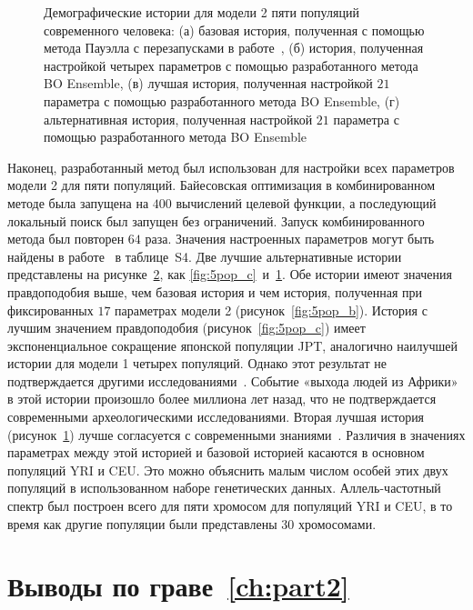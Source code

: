 \begin{figure}
\begin{subfigure}[t]{0.48\textwidth}
        \caption{}
        \label{fig:5pop_d}
    \end{subfigure}
    \caption{Демографические истории для модели 2 пяти популяций современного человека: (а) базовая история, полученная с помощью метода Пауэлла с перезапусками в работе~\cite{jouganous2017inferring}, (б) история, полученная настройкой четырех параметров с помощью разработанного метода BO Ensemble, (в) лучшая история, полученная настройкой $21$ параметра с помощью разработанного метода BO Ensemble, (г) альтернативная история, полученная настройкой $21$ параметра с помощью разработанного метода BO Ensemble}
    \label{fig:5pops_histories}
\end{figure}

Наконец, разработанный метод был использован для настройки всех параметров модели 2 для пяти популяций.
Байесовская оптимизация в комбинированном методе была запущена на $400$ вычислений целевой функции, а последующий локальный поиск был запущен без ограничений.
Запуск комбинированного метода был повторен $64$ раза.
Значения настроенных параметров могут быть найдены в работе~\cite{noskova2023bayesian} в таблице~S4.
Две лучшие альтернативные истории представлены на рисунке~\ref{fig:5pops_histories}, как \ref{fig:5pop_c}~и~\ref{fig:5pop_d}.
Обе истории имеют значения правдоподобия выше, чем базовая история и чем история, полученная при фиксированных $17$ параметрах модели 2 (рисунок~\ref{fig:5pop_b}).
История с лучшим значением правдоподобия (рисунок~\ref{fig:5pop_c}) имеет экспоненциальное сокращение японской популяции JPT, аналогично наилучшей истории для модели 1 четырех популяций.
Однако этот результат не подтверждается другими исследованиями~\cite{nielsen2017tracing}.
Событие «выхода людей из Африки» в этой истории произошло более миллиона лет назад, что не подтверждается современными археологическими исследованиями.
Вторая лучшая история (рисунок~\ref{fig:5pop_d}) лучше согласуется с современными знаниями~\cite{nielsen2017tracing}.
Различия в значениях параметрах между этой историей и базовой историей касаются в основном популяций YRI и CEU.
Это можно объяснить малым числом особей этих двух популяций в использованном наборе генетических данных.
Аллель-частотный спектр был построен всего для пяти хромосом для популяций YRI и CEU, в то время как другие популяции были представлены $30$ хромосомами.


\FloatBarrier

\section*{Выводы по граве~\ref{ch:part2}}

